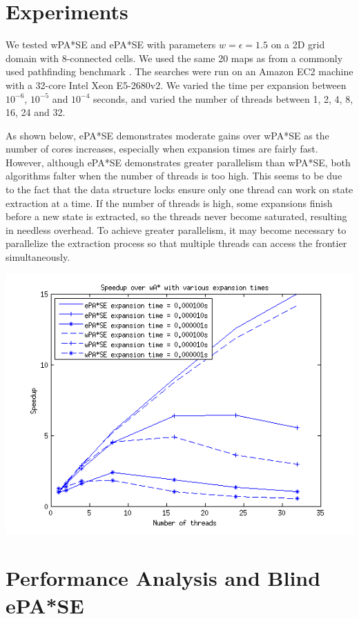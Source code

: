 \documentclass[letterpaper]{article}
\begin{document}
\section{Experiments}

We tested wPA*SE and ePA*SE with parameters $w=\epsilon=1.5$ on a 2D grid domain with 8-connected cells. We used the same 20 maps as \cite{phillips2014pa} from a commonly used pathfinding benchmark \cite{sturtevant2012benchmarks}. The searches were run on an Amazon EC2 machine with a 32-core Intel Xeon E5-2680v2. We varied the time per expansion between $10^{-6}$, $10^{-5}$ and $10^{-4}$ seconds, and varied the number of threads between 1, 2, 4, 8, 16, 24 and 32.

As shown below, ePA*SE demonstrates moderate gains over wPA*SE as the number of cores increases, especially when expansion times are fairly fast. However, although ePA*SE demonstrates greater parallelism than wPA*SE, both algorithms falter when the number of threads is too high. This seems to be due to the fact that the data structure locks ensure only one thread can work on state extraction at a time. If the number of threads is high, some expansions finish before a new state is extracted, so the threads never become saturated, resulting in needless overhead. To achieve greater parallelism, it may become necessary to parallelize the extraction process so that multiple threads can access the frontier simultaneously.

\includegraphics[scale=0.5]{time_sweep_all.png}

\section{Performance Analysis and Blind ePA*SE}
\end{document}
